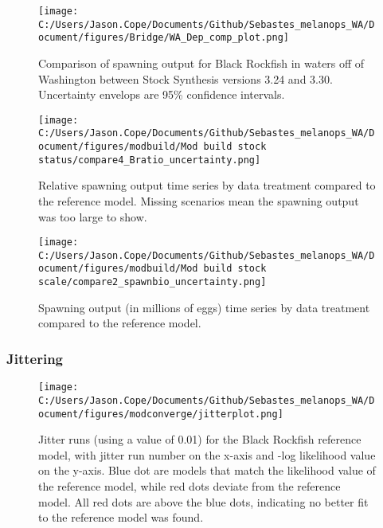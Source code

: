 \documentclass[11pt,
  english,
  letterpaper,
]{article}
\begin{document}
\pagebreak

\begin{figure}
\centering
\texttt{[image: C:/Users/Jason.Cope/Documents/Github/Sebastes\_melanops\_WA/Document/figures/Bridge/WA\_Dep\_comp\_plot.png]}
\caption{Comparison of spawning output for Black Rockfish in waters off of Washington between Stock Synthesis versions 3.24 and 3.30. Uncertainty envelops are 95\% confidence intervals.\label{fig:deps_bridge_comps}}
\end{figure}

\pagebreak

\begin{figure}
\centering
\texttt{[image: C:/Users/Jason.Cope/Documents/Github/Sebastes\_melanops\_WA/Document/figures/modbuild/Mod build stock status/compare4\_Bratio\_uncertainty.png]}
\caption{Relative spawning output time series by data treatment compared to the reference model. Missing scenarios mean the spawning output was too large to show.\label{fig:modbuild-data-depl}}
\end{figure}

\begin{figure}
\centering
\texttt{[image: C:/Users/Jason.Cope/Documents/Github/Sebastes\_melanops\_WA/Document/figures/modbuild/Mod build stock scale/compare2\_spawnbio\_uncertainty.png]}
\caption{Spawning output (in millions of eggs) time series by data treatment compared to the reference model.\label{fig:modbuild-data-ssb}}
\end{figure}

\hypertarget{jittering}{%
\subsubsection{Jittering}\label{jittering}}

\begin{figure}
\centering
\texttt{[image: C:/Users/Jason.Cope/Documents/Github/Sebastes\_melanops\_WA/Document/figures/modconverge/jitterplot.png]}
\caption{Jitter runs (using a value of 0.01) for the Black Rockfish reference model, with jitter run number on the x-axis and -log likelihood value on the y-axis. Blue dot are models that match the likelihood value of the reference model, while red dots deviate from the reference model. All red dots are above the blue dots, indicating no better fit to the reference model was found.\label{fig:jitter}}
\end{figure}
\end{document}
